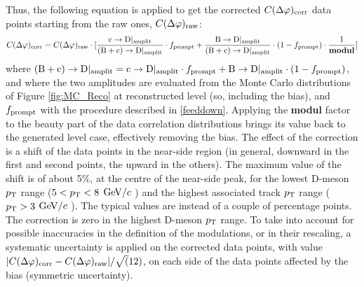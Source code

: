 Thus, the following equation is applied to get the corrected $C(\Delta\varphi)_{\rm corr}$ data points starting from the raw ones, $C(\Delta\varphi)_{\rm raw}$:
\begin{equation}
C(\Delta\varphi)_{\rm corr} = C(\Delta\varphi)_{\rm raw} \cdot [\frac{{\rm c}\rightarrow{\rm D}|_{\rm amplit}}{{\rm (B+c)}\rightarrow{\rm D}|_{\rm amplit}} \cdot f_{\rm prompt} + \frac{{\rm B}\rightarrow{\rm D}|_{\rm amplit}}{{\rm (B+c)}\rightarrow{\rm D}|_{\rm amplit}} \cdot (1-f_{\rm prompt})\cdot\frac{1}{\bf modul}]
\end{equation}
where ${\rm (B+c)}\rightarrow{\rm D}|_{\rm amplit} = {\rm c}\rightarrow{\rm D}|_{\rm amplit} \cdot f_{\rm prompt} + {\rm B}\rightarrow{\rm D}|_{\rm amplit} \cdot (1-f_{\rm prompt})$, and where the two amplitudes are evaluated from the Monte Carlo distributions of Figure \ref{fig:MC_Reco} at reconstructed level (so, including the bias), and $f_{\rm prompt}$ with the procedure described in \ref{feeddown}.
Applying the {\bf modul} factor to the beauty part of the data correlation distributions brings its value back to the generated level case, effectively removing the bias.
The effect of the correction is a shift of the data points in the near-side region (in general, downward in the first and second points, the upward in the others). The maximum value of the shift is of about 5\%, at the centre of the near-side peak, for the lowest D-meson $p_{\rm T}$ range ($5 < p_{\rm T} < 8$ $\mathrm{GeV}/c$ ) and the highest associated track $p_{\rm T}$ range ($p_{\rm T} > 3$ $\mathrm{GeV}/c$ ). The typical values are instead of a couple of percentage points. The correction is zero in the highest D-meson $p_{\rm T}$ range.
To take into account for possible inaccuracies in the definition of the modulations, or in their rescaling, a systematic uncertainty is  applied on the corrected data points, with value $|C(\Delta\varphi)_{\rm corr} - C(\Delta\varphi)_{\rm raw}|/\sqrt(12)$, on each side of the data points affected by the bias (symmetric uncertainty).

\clearpage
%
